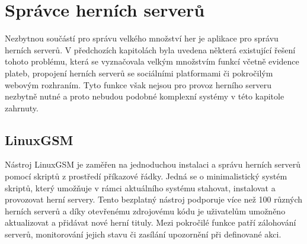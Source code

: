 \section{Správce herních serverů}

Nezbytnou součástí pro správu velkého množství her je aplikace pro správu herních serverů. V předchozích kapitolách
byla uvedena některá existující řešení tohoto problému, která se vyznačovala velkým množstvím funkcí včetně
evidence plateb, propojení herních serverů se sociálními platformami či pokročilým webovým rozhraním.
Tyto funkce však nejsou pro provoz herního serveru nezbytně nutné a proto nebudou podobné komplexní systémy v této kapitole zahrnuty.

\subsection{LinuxGSM}

Nástroj LinuxGSM \cite{linuxgsm} je zaměřen na jednoduchou instalaci a správu herních serverů pomocí skriptů z prostředí příkazové řádky.
Jedná se o minimalistický systém skriptů, který umožňuje v rámci aktuálního systému stahovat, instalovat a provozovat herní servery.
Tento bezplatný nástroj podporuje více než 100 různých herních serverů a díky otevřenému zdrojovému kódu je uživatelům umožněno aktualizovat
a přidávat nové herní tituly. Mezi pokročilé funkce patří zálohování serverů, monitorování jejich stavu či zasílání upozornění při definované akci.